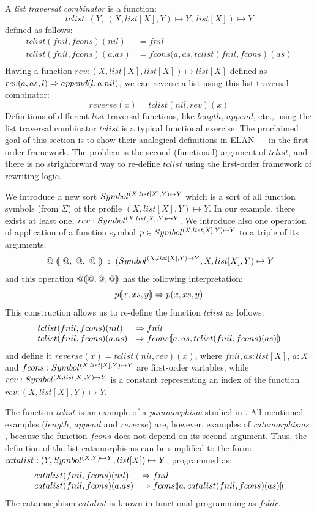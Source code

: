 \documentclass{article}
\begin{document}
{A {\em list traversal combinator} is a function:
\[
tclist : (Y,~ (X,list[X],Y) \mapsto  Y,~ list[X]) \mapsto  Y
\]
defined as follows:
\[\begin{array}{ll}
 tclist ( fnil, fcons )( nil )  &= fnil \\
 tclist ( fnil, fcons )( a.as ) &= fcons(a,as,tclist(fnil,fcons)(as) \\
\end{array}\]
Having a function $rev : (X, list[X], list[X]) \mapsto  list[X]$ defined as
$rev(a,as,l) \rewrite append(l,a.nil)$,
we can reverse a list using this list traversal combinator:
\[
    reverse(x) = tclist(nil, rev)(x)
\]
Definitions of different $list$ traversal functions, 
like $length$, $append$, etc., 
using the list traversal combinator $tclist$ is a 
typical functional exercise.
The proclaimed goal of this section is to show their analogical
definitions in ELAN --- in the first-order framework.
The problem is the second (functional) argument of $tclist$,
and
there is no strighforward way to re-define $tclist$
using the first-order framework of rewriting logic.

We introduce a new sort $Symbol^{(X,list[X],Y) \mapsto Y}$ which is 
a sort of all function symbols (from $\Sigma$) of the profile
$(X, list[X], Y) \mapsto  Y$.
In our example, there exists at least one,
$rev : Symbol^{(X,list[X],Y) \mapsto Y}$.
We introduce also one operation of application of a function symbol 
$p \in Symbol^{(X,list[X],Y) \mapsto Y}$ to a triple of its arguments:
\[
~@~ ( {\kern -2pt} [ ~@,~@,~@~ ] {\kern -2pt} ) ~:~ 
    (Symbol^{(X,list[X],Y) \mapsto Y},X,list[X],Y)\mapsto Y
\]
and this operation $@( {\kern -2pt} [ @,@,@ ] {\kern -2pt} )$ has the following interpretation:
\[
p \lban x, xs, y \rban \rewrite p(x,xs,y)
\]
This construction allows us to re-define the function 
$tclist$ as follows:
\[\begin{array}{ll}
  tclist(fnil,fcons)(nil)  &\rewrite fnil \\
  tclist(fnil,fcons)(a.as) &\rewrite 
  fcons \lban a,as,tclist(fnil,fcons)(as) \rban
\end{array}\]
and define it $reverse(x) = tclist(nil,rev)(x)$, where
$fnil,as : list[X]$, $a:X$ and $fcons : Symbol^{(X,list[X],Y) \mapsto Y}$
are first-order variables, while
$rev: Symbol^{(X,list[X],Y) \mapsto Y}$ is a constant representing
an index of the function $rev: (X,list[X],Y) \mapsto Y$.

The function $tclist$ is an example of a
{\em paramorphism}%
studied in \cite{Meert}.
All mentioned examples ($length$, $append$ and $reverse$) are,
however,
examples of {\em catamorphisms}%
, because
the function $fcons$ does not depend on its second argument.
Thus, the definition of the list-catamorphisms can be simplified 
to the form:
$catalist : (Y, Symbol^{(X,Y) \mapsto Y}, list[X]) \mapsto  Y$,
programmed as:
\[\begin{array}{ll}
  catalist(fnil,fcons)(nil)  &\rewrite fnil \\
  catalist(fnil,fcons)(a.as) &\rewrite 
  fcons \lban a,catalist(fnil,fcons)(as) \rban
\end{array}\]
The catamorphism $catalist$ is known in functional programming
as $foldr$.

}
\end{document}
